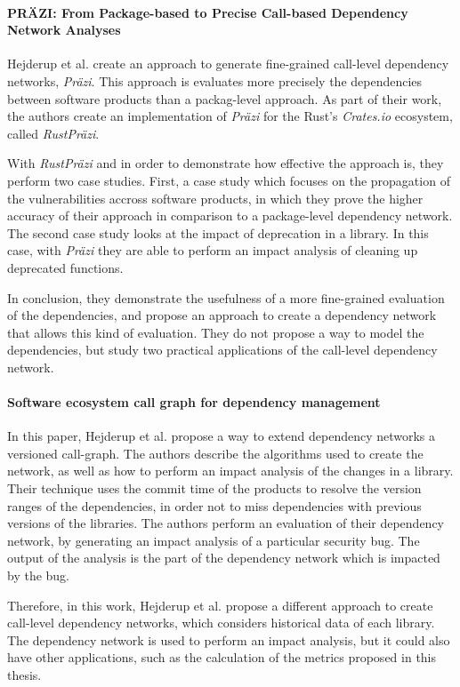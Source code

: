 \paragraph{PRÄZI: From Package-based to Precise Call-based Dependency Network Analyses \cite{hejderup2018prazi}}
Hejderup et al. create an approach to generate fine-grained call-level dependency networks, \textit{Präzi}. This approach is evaluates more precisely the dependencies between software products than a packag-level approach. As part of their work, the authors create an implementation of \textit{Präzi} for the Rust's \textit{Crates.io} ecosystem, called \textit{RustPräzi}.

With \textit{RustPräzi} and in order to demonstrate how effective the approach is, they perform two case studies. First, a case study which focuses on the propagation of the vulnerabilities accross software products, in which they prove the higher accuracy of their approach in comparison to a package-level dependency network. The second case study looks at the impact of deprecation in a library. In this case, with \textit{Präzi} they are able to perform an impact analysis of cleaning up deprecated functions.

In conclusion, they demonstrate the usefulness of a more fine-grained evaluation of the dependencies, and propose an approach to create a dependency network that allows this kind of evaluation. They do not propose a way to model the dependencies, but study two practical applications of the call-level dependency network.

\paragraph{Software ecosystem call graph for dependency management \cite{hejderup2018software}}
In this paper, Hejderup et al. propose a way to extend dependency networks a versioned call-graph. The authors describe the algorithms used to create the network, as well as how to perform an impact analysis of the changes in a library. Their technique uses the commit time of the products to resolve the version ranges of the dependencies, in order not to miss dependencies with previous versions of the libraries. The authors perform an evaluation of their dependency network, by generating an impact analysis of a particular security bug. The output of the analysis is the part of the dependency network which is impacted by the bug.

Therefore, in this work, Hejderup et al. propose a different approach to create call-level dependency networks, which considers historical data of each library. The dependency network is used to perform an impact analysis, but it could also have other applications, such as the calculation of the metrics proposed in this thesis.

